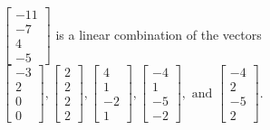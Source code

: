 \begin{exercise}
\begin{exerciseStatement}
  \end{exerciseStatement}
  \begin{exerciseAnswer}
   \(\left[\begin{array}{c}
-11 \\
-7 \\
4 \\
-5
\end{array}\right]\) 
  	 is  
	a linear combination of the vectors \(\left[\begin{array}{c}
-3 \\
2 \\
0 \\
0
\end{array}\right] , \left[\begin{array}{c}
2 \\
2 \\
2 \\
2
\end{array}\right] , \left[\begin{array}{c}
4 \\
1 \\
-2 \\
1
\end{array}\right] , \left[\begin{array}{c}
-4 \\
1 \\
-5 \\
-2
\end{array}\right] , \text{ and } \left[\begin{array}{c}
-4 \\
2 \\
-5 \\
2
\end{array}\right]\).

	
  


  \end{exerciseAnswer}
\end{exercise}